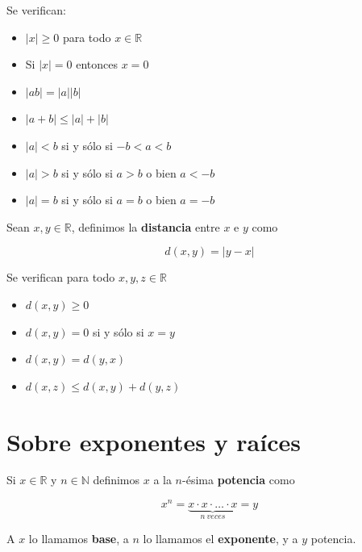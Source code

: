 \begin{property}
Se verifican: 

\begin{itemize}
\item $ |x| \geq 0 $ para todo $x \in \mathbb{R}$
\item Si $ |x| = 0$ entonces $x = 0$
\item $ |ab| = |a| |b|$
\item $|a+b| \leq |a| + |b|$

\item $|a| < b$ si y sólo si $-b < a < b$

\item $|a| > b$ si y sólo si $a > b$ o bien $a < -b$

\item $|a| = b$ si y sólo si $a=b$ o bien $a = -b$

\end{itemize}
\end{property}

\begin{definition}[Distancia] 
Sean $x, y \in \mathbb{R}$, definimos la \textbf{distancia} entre $x$ e $y$ como 

$$d(x,y) = |y - x|$$

\end{definition}

\begin{property}[de la distancia] Se verifican para todo $x,y,z \in \mathbb{R}$

\begin{itemize}
\item $d(x,y) \geq 0$
\item $d(x,y) = 0$ si y sólo si $x=y$
\item $d(x,y) = d(y,x)$
\item $d(x,z) \leq d(x,y) + d(y,z)$
\end{itemize}

\end{property}


\section{Sobre exponentes y raíces}

\begin{definition} 
Si $x \in \mathbb{R}$ y $n \in \mathbb{N}$ definimos $x$ a la $n$-ésima \textbf{potencia} como

$$x^n = \underbrace{x \cdot x \cdot \ldots \cdot x}_{n \ veces} = y$$

A $x$ lo llamamos \textbf{base}, a $n$ lo llamamos el \textbf{exponente}, y a $y$ potencia.
\end{definition}

